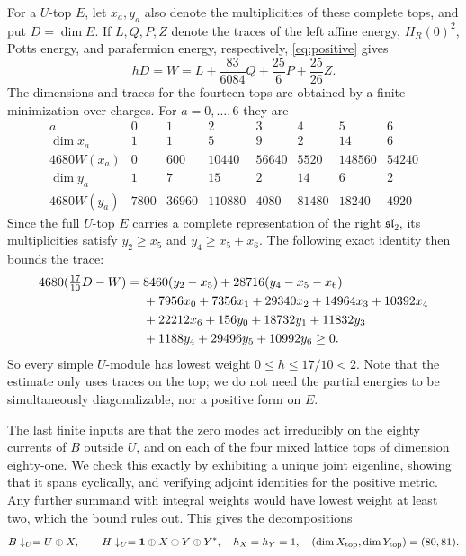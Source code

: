 \documentclass[11pt,a4paper]{article}
\newcommand{\one}{\mathbf1}
\begin{document}
For a $U$-top $E$, let $x_a,y_a$ also denote the multiplicities of
these complete tops, and put $D=\dim E$. If $L,Q,P,Z$ denote the
traces of the left affine energy, $H_R(0)^2$, Potts energy, and
parafermion energy, respectively, \eqref{eq:positive} gives
\begin{equation}\label{eq:W}
 hD=W=L+\frac{83}{6084}Q+\frac{25}{6}P+\frac{25}{26}Z.
\end{equation}
The dimensions and traces for the fourteen tops are obtained by a
finite minimization over charges. For $a=0,\ldots,6$ they are
\[
\begin{array}{c|rrrrrrr}
 a&0&1&2&3&4&5&6\\\hline
 \dim x_a&1&1&5&9&2&14&6\\
 4680W(x_a)&0&600&10440&56640&5520&148560&54240\\
 \dim y_a&1&7&15&2&14&6&2\\
 4680W(y_a)&7800&36960&110880&4080&81480&18240&4920
\end{array}
\]
Since the full $U$-top $E$ carries a complete representation of the right
$\mathfrak{sl}_2$, its multiplicities satisfy $y_2\ge x_5$ and
$y_4\ge x_5+x_6$. The following exact identity then bounds the trace:
\begin{align}\label{eq:topbound}
 4680(\tfrac{17}{10}D-W)
 ={}&8460(y_2-x_5)+28716(y_4-x_5-x_6)\notag\\
 &+7956x_0+7356x_1+29340x_2+14964x_3+10392x_4\notag\\
 &+22212x_6+156y_0+18732y_1+11832y_3\notag\\
 &+1188y_4+29496y_5+10992y_6\ge0.
\end{align}
So every simple $U$-module has lowest weight $0\le h\le17/10<2$. Note
that the estimate only uses traces on the top; we do not need the
partial energies to be simultaneously diagonalizable, nor a positive
form on $E$.

The last finite inputs are that the zero modes act irreducibly on the
eighty currents of $B$ outside $U$, and on each of the four mixed
lattice tops of dimension eighty-one. We check this exactly by
exhibiting a unique joint eigenline, showing that it spans cyclically,
and verifying adjoint identities for the positive metric. Any further
summand with integral weights would have lowest weight at least two,
which the bound rules out. This gives the decompositions
\begin{equation}\label{eq:branch}
 B\downarrow_U=U\oplus X,\qquad
 H\downarrow_U=\one\oplus X\oplus Y\oplus Y^*,
 \quad h_X=h_Y=1,
 \quad (\dim X_{\rm top},\dim Y_{\rm top})=(80,81).
\end{equation}
\end{document}
